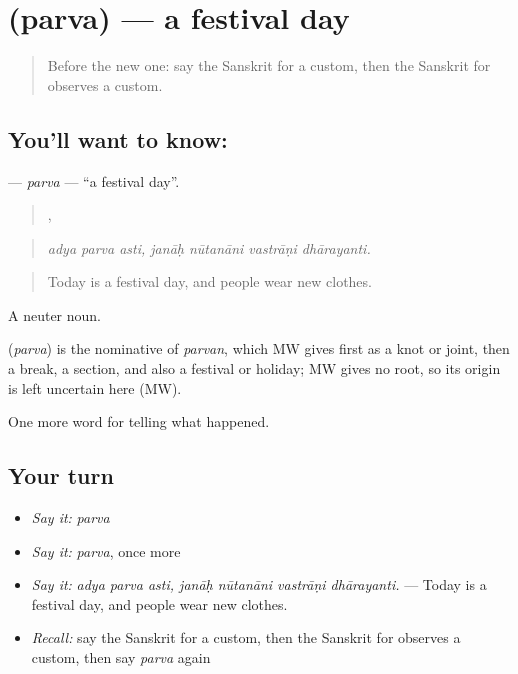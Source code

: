 \section[\texorpdfstring{\sk{पर्व} (parva)}{पर्व (parva)}]{ (parva) — a festival day}

\label{lesson:SA-C330-parva}



\begin{quote}
Before the new one: say the Sanskrit for a custom, then the Sanskrit for observes a custom.
\end{quote}

\subsection*{You'll want to know: }
\textbf{} — \emph{parva} — \textquotedblleft{}a festival day\textquotedblright{}.

\begin{quote}
  ,    
\end{quote}

\begin{quote}
\emph{adya parva asti, janāḥ nūtanāni vastrāṇi dhārayanti.}
\end{quote}

\begin{quote}
Today is a festival day, and people wear new clothes.
\end{quote}

A neuter noun.

\begin{cousinweb}
\textbf{} (\emph{parva}) is the nominative of \emph{parvan}, which MW gives first as a knot or joint, then a break, a section, and also a festival or holiday; MW gives no root, so its origin is left uncertain here (MW).
\end{cousinweb}

\begin{grammarlens}[title={What you've built}]
One more word for telling what happened.
\end{grammarlens}

\subsection*{Your turn}
\begin{itemize}
\raggedright
  \item \emph{Say it:} \emph{parva}
  \item \emph{Say it:} \emph{parva}, once more
  \item \emph{Say it:} \emph{adya parva asti, janāḥ nūtanāni vastrāṇi dhārayanti.} — Today is a festival day, and people wear new clothes.
  \item \emph{Recall:} say the Sanskrit for a custom, then the Sanskrit for observes a custom, then say \emph{parva} again
\end{itemize}

